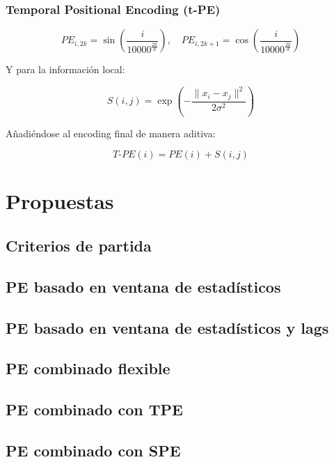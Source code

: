 \subsubsection{Temporal Positional Encoding (t-PE)}



$$
PE_{i, 2k} = \sin\left(\frac{i}{10000^{\frac{2k}{d}}}\right), \quad
PE_{i, 2k+1} = \cos\left(\frac{i}{10000^{\frac{2k}{d}}}\right)
$$

Y para la información local:

$$S(i, j) = \exp\left( -\frac{\|x_i - x_j\|^2}{2\sigma^2} \right)$$

Añadiéndose al encoding final de manera aditiva:

$$T\text{-}PE(i) = PE(i) + S(i, j)$$


\section{Propuestas}
\subsection{Criterios de partida}
\subsection{PE basado en ventana de estadísticos}
\subsection{PE basado en ventana de estadísticos y lags}
\subsection{PE combinado flexible}
\subsection{PE combinado con TPE}
\subsection{PE combinado con SPE}



